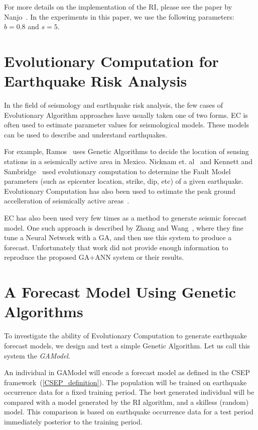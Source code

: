 \documentclass{sig-alternate}
\begin{document}
For more details on the implementation of the RI, please see the paper
by Nanjo~\cite{Nanjo2011}. In the experiments in this paper, we use
the following parameters: $b = 0.8$ and $s = 5$.

\section{Evolutionary Computation for Earthquake Risk Analysis}

In the field of seismology and earthquake risk analysis, the few cases
of Evolutionary Algorithm approaches have usually taken one of two
forms. EC is often used to estimate parameter values for seismological
models.  These models can be used to describe and understand
earthquakes.

For example, Ramos~\cite{Ramos2011} uses Genetic Algorithms to decide
the location of sensing stations in a seismically active area in
Mexico. Nicknam et. al~\cite{Nicknam2010} and Kennett and
Sambridge~\cite{Kennett1992} used evolutionary computation to
determine the Fault Model parameters (such as epicenter location,
strike, dip, etc) of a given earthquake. Evolutionary Computation has
also been used to estimate the peak ground accelleration of
seismically active areas~\cite{Kermani2009, Cabalar2009}.

EC has also been used very few times as a method to generate seismic
forecast model. One such approach is described by Zhang and
Wang~\cite{Zhang2012}, where they fine tune a Neural Network with a
GA, and then use this system to produce a forecast. Unfortunately that
work did not provide enough information to reproduce the proposed
GA+ANN system or their results.

\section{A Forecast Model Using Genetic Algorithms} 

To investigate the ability of Evolutionary Computation to generate
earthquake forecast models, we design and test a simple Genetic
Algorithm. Let us call this system the \emph{GAModel}.

An individual in GAModel will encode a forecast model as defined in
the CSEP framework~(\ref{CSEP_definition}). The population will be
trained on earthquake occurrence data for a fixed training period. The
best generated individual will be compared with a model generated by
the RI algorithm, and a skilless (random) model. This comparison is
based on earthquake occurrence data for a test period immediately
posterior to the training period.
\end{document}
